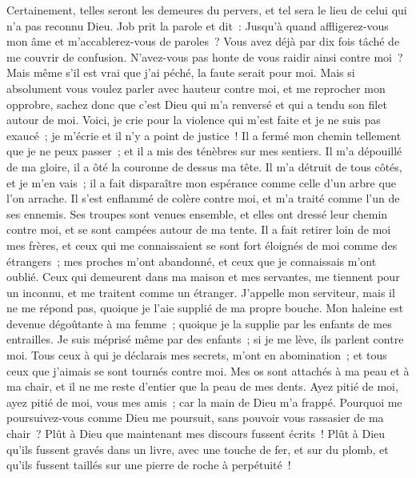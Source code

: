 \begin{multicols}{2}
Certainement, telles seront les demeures du pervers, et tel sera le lieu de celui qui n'a pas reconnu Dieu.
\VerseOne{}Job prit la parole et dit~:
Jusqu'à quand affligerez-vous mon âme et m'accablerez-vous de paroles~? 
Vous avez déjà par dix fois tâché de me couvrir de confusion. N'avez-vous pas honte de vous raidir ainsi contre moi~? 
Mais même s'il est vrai que j'ai péché, la faute serait pour moi. 
Mais si absolument vous voulez parler avec hauteur contre moi, et me reprocher mon opprobre, 
sachez donc que c'est Dieu qui m'a renversé et qui a tendu son filet autour de moi. 
Voici, je crie pour la violence qui m'est faite et je ne suis pas exaucé~; je m'écrie et il n'y a point de justice~!
Il a fermé mon chemin tellement que je ne peux passer~; et il a mis des ténèbres sur mes sentiers. 
Il m'a dépouillé de ma gloire, il a ôté la couronne de dessus ma tête.
Il m'a détruit de tous côtés, et je m'en vais~; il a fait disparaître mon espérance comme celle d'un arbre que l'on arrache. 
Il s'est enflammé de colère contre moi, et m'a traité comme l'un de ses ennemis.
Ses troupes sont venues ensemble, et elles ont dressé leur chemin contre moi, et se sont campées autour de ma tente.
Il a fait retirer loin de moi mes frères, et ceux qui me connaissaient se sont fort éloignés de moi comme des étrangers~;
mes proches m'ont abandonné, et ceux que je connaissais m'ont oublié.
Ceux qui demeurent dans ma maison et mes servantes, me tiennent pour un inconnu, et me traitent comme un étranger. 
J'appelle mon serviteur, mais il ne me répond pas, quoique je l'aie supplié de ma propre bouche.
Mon haleine est devenue dégoûtante à ma femme~; quoique je la supplie par les enfants de mes entrailles.
Je suis méprisé même par des enfants~; si je me lève, ils parlent contre moi.
Tous ceux à qui je déclarais mes secrets, m'ont en abomination~; et tous ceux que j'aimais se sont tournés contre moi.
Mes os sont attachés à ma peau et à ma chair, et il ne me reste d'entier que la peau de mes dents.
Ayez pitié de moi, ayez pitié de moi, vous mes amis~; car la main de Dieu m'a frappé.
Pourquoi me poursuivez-vous comme Dieu me poursuit, sans pouvoir vous rassasier de ma chair~?
Plût à Dieu que maintenant mes discours fussent écrits~! Plût à Dieu qu'ils fussent gravés dans un livre, 
avec une touche de fer, et sur du plomb, et qu'ils fussent taillés sur une pierre de roche à perpétuité~!

\end{multicols}
